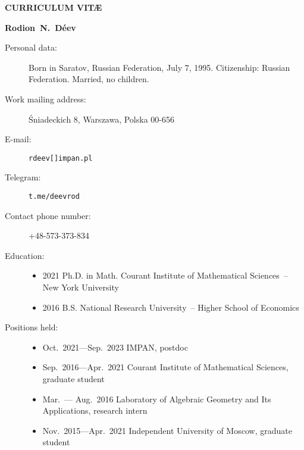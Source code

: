 \documentclass{article}
\begin{document}
\centerline{\bf\large CURRICULUM VIT\AE}

\vspace{3mm}

\centerline{\bf Rodion~N.~D\'eev}

\begin{description}

\item[Personal data:]  Born in Saratov, Russian Federation, July 7, 1995. 
Citizenship: Russian Federation. Married,  no children.

\item[Work mailing address:] \'Sniadeckich 8,  Warszawa,  Polska 00-656


\item[E-mail:] {\tt rdeev[]impan.pl}

\item[Telegram:] {\tt t.me/deevrod}

\item[Contact phone number:] +48-573-373-834

\item[Education:] \begin{itemize}
     \item 2021 \hspace{2mm} Ph.D. in Math. \hspace{2mm} Courant
     Institute of Mathematical Sciences~-- New York University
     \item 2016 \hspace{2mm} B.S. \hspace{2mm} National Research
     University~-- Higher School of Economics
\end{itemize}

\item[Positions held:] \begin{itemize}
     \item Oct.~2021---Sep.~2023 \hspace{2mm} IMPAN,  postdoc
     \item Sep.~2016---Apr.~2021 \hspace{2mm} Courant Institute of Mathematical Sciences,
     graduate student
     \item Mar.~--- Aug.~2016 \hspace{2mm} Laboratory of Algebraic Geometry
	and Its Applications, research intern
     \item Nov.~2015---Apr.~2021 \hspace{2mm} Independent University of Moscow,
     graduate student
\end{itemize}


\end{description}
\end{document}
